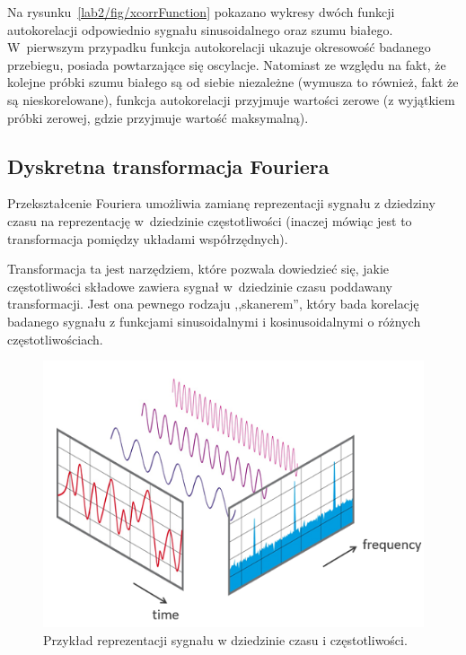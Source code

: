 Na rysunku~\ref{lab2/fig/xcorrFunction} pokazano wykresy dwóch funkcji autokorelacji odpowiednio sygnału sinusoidalnego oraz szumu białego. W~pierwszym przypadku funkcja autokorelacji ukazuje okresowość badanego przebiegu, posiada powtarzające się oscylacje. Natomiast ze względu na fakt, że kolejne próbki szumu białego są od siebie niezależne (wymusza to również, fakt że są nieskorelowane), funkcja autokorelacji przyjmuje wartości zerowe (z wyjątkiem próbki zerowej, gdzie przyjmuje wartość maksymalną). 

\subsection{Dyskretna transformacja Fouriera}
Przekształcenie Fouriera umożliwia zamianę reprezentacji sygnału z dziedziny czasu na reprezentację w~dziedzinie częstotliwości (inaczej mówiąc jest to transformacja pomiędzy układami współrzędnych). 

Transformacja ta jest narzędziem, które pozwala dowiedzieć się, jakie częstotliwości składowe zawiera sygnał w~dziedzinie czasu poddawany transformacji. Jest ona pewnego rodzaju ,,skanerem'', który bada korelację badanego sygnału z funkcjami sinusoidalnymi i kosinusoidalnymi o różnych częstotliwościach.
\begin{figure}[hbt!]
	\centering
	\includegraphics[width=0.9\linewidth]{images/fourierTransform.png}
	\caption{Przykład reprezentacji sygnału w dziedzinie czasu i częstotliwości.}
	\label{lab2/fig/fourierTransform}
\end{figure}

